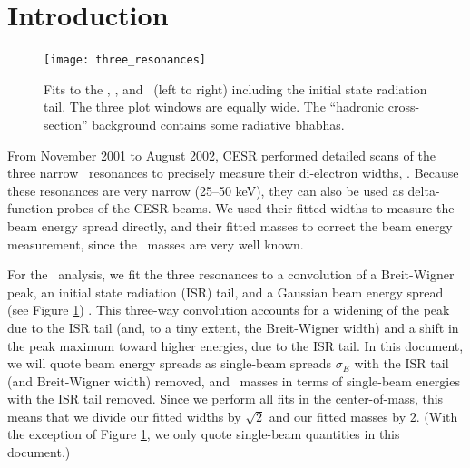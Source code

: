 \documentclass[aps,prd,preprint,superscriptaddress,tightenlines,nofootinbib,floatfix]{revtex4}
\begin{document}
%
%

\begin{abstract} 
We present fit results of \uone, \utwo, and \uthree\ lineshape scans
that are relevant for studies of CESR.  The beam energy spread
($\sigma_E/E$) is 20\% narrower than expected, though its relationship
with beam energy is linear, with a slope of (119 $\pm$ 75) $\times$
10$^{-6}$ GeV\inv.  We also find that the beam energy measurement
varies by $\sim$0.3 MeV/5 GeV from week to week, but less than 0.07
MeV within a 10-hour scan period (68\% C.L.).  Measured \ups\ masses/2
are lower than PDG masses/2 by (0.20 $\pm$ 0.14) MeV, (-0.46 $\pm$
0.20) MeV, and (-1.51 $\pm$ 0.33) MeV for the \uone, \utwo, and
\uthree\ respectively.
\end{abstract}
\maketitle

\section{Introduction}

\begin{figure}[t]
  \begin{center}
    \texttt{[image: three\_resonances]}
  \end{center}
  \caption{\label{upsilons} Fits to the \uone, \utwo, and \uthree\
    (left to right) including the initial state radiation tail.  The
    three plot windows are equally wide.  The ``hadronic
    cross-section'' background contains some radiative bhabhas.}
\end{figure}

From November 2001 to August 2002, CESR performed detailed scans of the
three narrow \ups\ resonances to precisely measure their di-electron
widths, \gee.  Because these resonances are very narrow (25--50 keV),
they can also be used as delta-function probes of the CESR beams.  We
used their fitted widths to measure the beam energy spread directly,
and their fitted masses to correct the beam energy measurement, since
the \ups\ masses are very well known.

For the \gee\ analysis, we fit the three resonances to a convolution
of a Breit-Wigner peak, an initial state radiation (ISR) tail, and a
Gaussian beam energy spread (see Figure \ref{upsilons}) \cite{kb}.
This three-way convolution accounts for a widening of the peak due to
the ISR tail (and, to a tiny extent, the Breit-Wigner width) and a
shift in the peak maximum toward higher energies, due to the ISR tail.
In this document, we will quote beam energy spreads as single-beam
spreads $\sigma_E$ with the ISR tail (and Breit-Wigner width) removed,
and \ups\ masses in terms of single-beam energies with the ISR tail
removed.  Since we perform all fits in the center-of-mass, this means
that we divide our fitted widths by $\sqrt{2}$ and our fitted masses
by $2$.  (With the exception of Figure \ref{upsilons}, we only quote
single-beam quantities in this document.)
\end{document}
